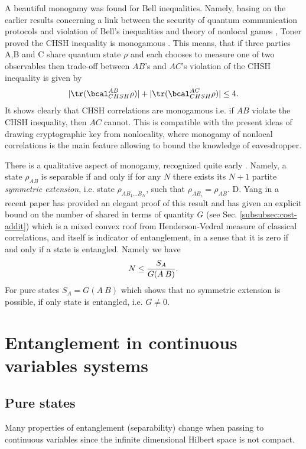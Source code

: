 \documentclass[twocolumn,aps,rmp]{revtex4}
\begin{document}
A beautiful monogamy was found for Bell inequalities. Namely, basing
on the earlier results concerning a link between the security of
quantum communication protocols and violation of Bell's inequalities
\cite {Scarani1} and theory of nonlocal games \cite{Cleve}, Toner
proved the CHSH inequality is monogamous \cite {Toner}. This means,
that if three parties A,B and C share quantum state $\rho$ and each
chooses to measure one of two observables then trade-off between
$AB$'s and $AC$'s violation of the CHSH inequality is given by
\begin{equation}
|{\tr}(\bcal^{AB}_{CHSH}\rho)|+ |{\tr}(\bcal^{AC}_{CHSH}\rho)|\leq 4.
\label{trad}
\end{equation}
It shows clearly that CHSH correlations are monogamous i.e. if $AB$
violate the CHSH inequality, then $AC$ cannot. This is compatible with
the present ideas of drawing cryptographic key from nonlocality, where
monogamy of nonlocal correlations is the main feature allowing to
bound the knowledge of eavesdropper.

There is a qualitative aspect of monogamy, recognized quite early
\cite{Werner1989-sym-ext,DohertyPS04}. Namely, a state $\rho_{AB}$ is
separable if and only if for any $N$ there exists its $N+1$ partite
{\it symmetric extension}, i.e. state $\rho_{A B_1\ldots B_N}$, such
that $\rho_{AB_i}=\rho_{AB}$. D. Yang in a recent paper
\cite{Yang2006-sym-ext} has provided an elegant proof of this result
and has given an explicit bound on the number of shared in terms of
quantity $G$ (see Sec.  \ref{subsubsec:cost-addit}) which is a mixed
convex roof from Henderson-Vedral measure of classical correlations,
and itself is indicator of entanglement, in a sense that it is zero if
and only if a state is entangled. Namely we have
\begin{equation}
N\leq {S_A\over G(A\>B)}.
\end{equation}
For pure states $S_A=G(A\>B)$ which shows that no symmetric extension
is possible, if only state is entangled, i.e.  $G\not=0$.



\section{Entanglement in continuous variables systems}
\subsection{Pure states}

Many properties of entanglement (separability) change when passing to
continuous variables since the infinite dimensional Hilbert space is
not compact.
\end{document}
